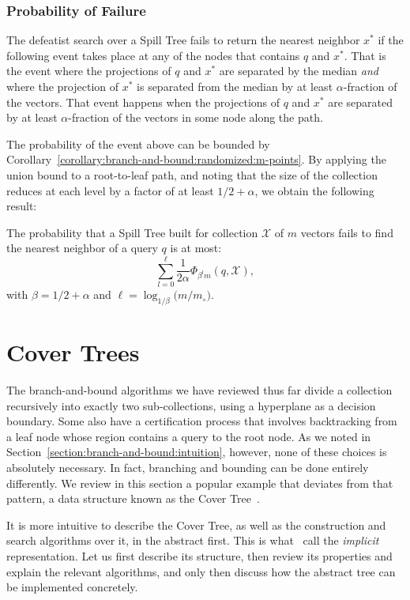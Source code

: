 \subsubsection{Probability of Failure}
The defeatist search over a Spill Tree fails to return the nearest neighbor $x^\ast$
if the following event takes place at any of the nodes that contains $q$ and $x^\ast$.
That is the event where the projections of $q$ and $x^\ast$ are separated by the median \emph{and}
where the projection of $x^\ast$ is separated from the median by at least $\alpha$-fraction of the vectors.
That event happens when the projections of $q$ and $x^\ast$ are separated by
at least $\alpha$-fraction of the vectors in some node along the path.

The probability of the event above can be bounded by Corollary~\ref{corollary:branch-and-bound:randomized:m-points}.
By applying the union bound to a root-to-leaf path, and noting that the size of the collection
reduces at each level by a factor of at least $1/2 + \alpha$, we obtain the following result:

\begin{theorem}
    The probability that a Spill Tree built for collection $\mathcal{X}$ of $m$ vectors fails to find the nearest neighbor
    of a query $q$ is at most:
    \begin{equation*}
        \sum_{l = 0}^{\ell} \frac{1}{2\alpha} \Phi_{\beta^l m}(q, \mathcal{X}),
    \end{equation*}
    with $\beta = 1/2 + \alpha$ and $\ell = \log_{1/\beta} \big( m / m_\circ \big)$.
\end{theorem}

\section{Cover Trees}
The branch-and-bound algorithms we have reviewed thus far divide a
collection recursively into exactly two sub-collections, using a 
hyperplane as a decision boundary. Some also have a certification process
that involves backtracking from a leaf node whose region contains a query
to the root node. As we noted in Section~\ref{section:branch-and-bound:intuition},
however, none of these choices is absolutely necessary. In fact,
branching and bounding can be done entirely differently. We review
in this section a popular example that deviates from that pattern,
a data structure known as the Cover Tree~\citep{covertrees}.

It is more intuitive to describe the Cover Tree, as well as the construction
and search algorithms over it, in the abstract first. This is
what~\cite{covertrees} call the \emph{implicit} representation.
Let us first describe its structure, then review its properties
and explain the relevant algorithms,
and only then discuss how the abstract tree can be implemented concretely.

